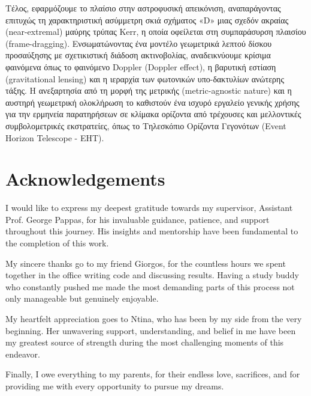 \documentclass[11pt]{book}
\begin{document}
Τέλος, εφαρμόζουμε το πλαίσιο στην αστροφυσική απεικόνιση, αναπαράγοντας επιτυχώς τη χαρακτηριστική ασύμμετρη σκιά σχήματος «D» μιας σχεδόν ακραίας (near-extremal) μαύρης τρύπας Kerr, η οποία οφείλεται στη συμπαράσυρση πλαισίου (frame-dragging). Ενσωματώνοντας ένα μοντέλο γεωμετρικά λεπτού δίσκου προσαύξησης με σχετικιστική διάδοση ακτινοβολίας, αναδεικνύουμε κρίσιμα φαινόμενα όπως το φαινόμενο Doppler (Doppler effect), η βαρυτική εστίαση (gravitational lensing) και η ιεραρχία των φωτονικών υπο-δακτυλίων ανώτερης τάξης. Η ανεξαρτησία από τη μορφή της μετρικής (metric-agnostic nature) και η αυστηρή γεωμετρική ολοκλήρωση το καθιστούν ένα ισχυρό εργαλείο γενικής χρήσης για την ερμηνεία παρατηρήσεων σε κλίμακα ορίζοντα από τρέχουσες και μελλοντικές συμβολομετρικές εκστρατείες, όπως το Τηλεσκόπιο Ορίζοντα Γεγονότων (Event Horizon Telescope - EHT).

\newpage

\thispagestyle{empty} 
\section*{Acknowledgements}

I would like to express my deepest gratitude towards my supervisor, Assistant Prof. George Pappas, for his invaluable guidance, patience, and support throughout this journey. His insights and mentorship have been fundamental to the completion of this work.

My sincere thanks go to my friend Giorgos, for the countless hours we spent together in the office writing code and discussing results. Having a study buddy who constantly pushed me made the most demanding parts of this process not only manageable but genuinely enjoyable.

My heartfelt appreciation goes to Ntina, who has been by my side from the very beginning. Her unwavering support, understanding, and belief in me have been my greatest source of strength during the most challenging moments of this endeavor.

Finally, I owe everything to my parents, for their endless love, sacrifices, and for providing me with every opportunity to pursue my dreams.
\end{document}
